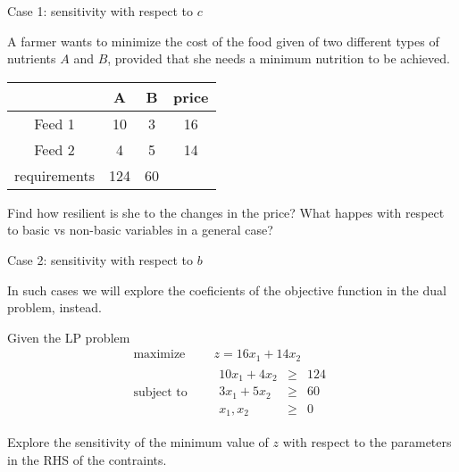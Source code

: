 \documentclass[c]{beamer}
\begin{document}
\begin{frame}{Case 1: sensitivity with respect to $c$}

  \begin{Exercise}
    A farmer wants to minimize the cost of the food given of two different types of nutrients $A$ and $B$, provided that she needs a minimum nutrition to be achieved.
    \begin{center}
    \begin{tabular}{c|c|c|c}
     & A & B & price\\
     \hline
     Feed 1 & 10 & 3 & 16\\
     Feed 2 & 4 & 5 & 14\\
     \hline
     requirements & 124 & 60 & \\
    \end{tabular}
    \end{center}

    Find how resilient is she to the changes in the price? What happes with respect to basic vs non-basic variables in a general case?

  \end{Exercise}
\end{frame}

\begin{frame}{Case 2: sensitivity with respect to $b$}

  In such cases we will explore the coeficients of the objective function in the dual problem, instead.

  \begin{Exercise}
    Given the LP problem
    \begin{equation*}
      \begin{aligned}
        \text{maximize } \quad & z = 16x_1+14x_2 \\
        \text{subject to }\quad &
        \begin{array}{rcl}
          10x_1 + 4x_2 &\geq &124 \\
          3x_1 + 5x_2 &\geq &60 \\
          x_1,x_2 &\geq& 0
        \end{array}
      \end{aligned}
    \end{equation*}

    Explore the sensitivity of the minimum value of $z$ with respect to the parameters in the RHS of the contraints.

  \end{Exercise}

\end{frame}
\end{document}
